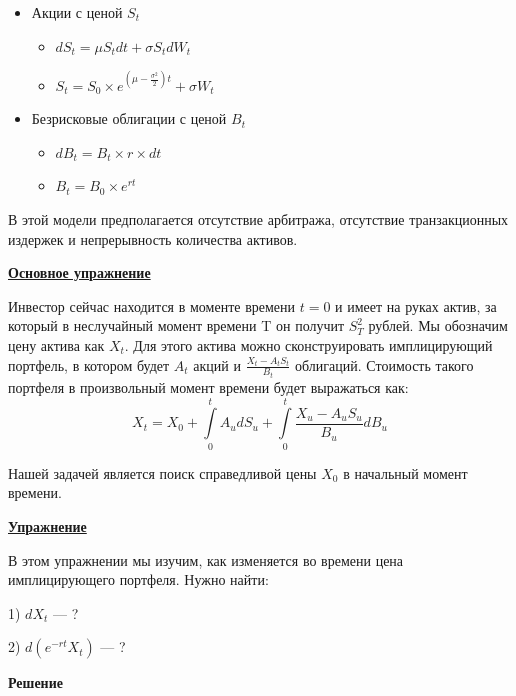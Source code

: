 \documentclass[a4paper]{article}
\begin{document}
 \begin{itemize}
   \item  Акции с ценой $S_t$
   \begin{itemize}
     \item  $dS_t = \mu S_t dt + \sigma S_t dW_t$
     \item  $S_t = S_0 \times e^{(\mu - \frac{\sigma^2}{2})t} + \sigma W_t$
     \end{itemize}
     \item Безрисковые облигации с ценой $B_t$
     \begin{itemize}
     \item  $dB_t=B_t \times r \times dt$
     \item  $B_t = B_0 \times e^{rt}$
     \end{itemize}
 \end{itemize}
В этой модели предполагается отсутствие арбитража, отсутствие транзакционных издержек и непрерывность количества активов.

 \vspace{5mm}

  \par {\bf\underline{Основное упражнение}}

  Инвестор сейчас находится в моменте времени $t=0$ и имеет на руках актив, за который в неслучайный момент времени T он получит $S^2_T$ рублей. Мы обозначим цену актива как $X_t$. Для этого актива можно сконструировать имплицирующий портфель, в котором будет $A_t$ акций и $\frac{X_t -A_t S_t}{B_t}$ облигаций. Стоимость такого портфеля в произвольный момент времени будет выражаться как:\\
  \[
  X_t = X_0 + \int\limits_{0}^{t}A_u d S_u + \int\limits_{0}^{t}\frac{X_u - A_u S_u}{B_u}dB_u\]

  Нашей задачей является поиск справедливой цены $X_0$ в начальный момент времени.


   \vspace{5mm}

  \par {\bf\underline{Упражнение}}

  В этом упражнении мы изучим, как изменяется во времени цена имплицирующего портфеля. Нужно найти:

  1) $dX_t$ — ?

  2) $d(e^{-rt}X_t)$ — ?

  \vspace{5mm}

\par {\bf{Решение}}
\end{document}
